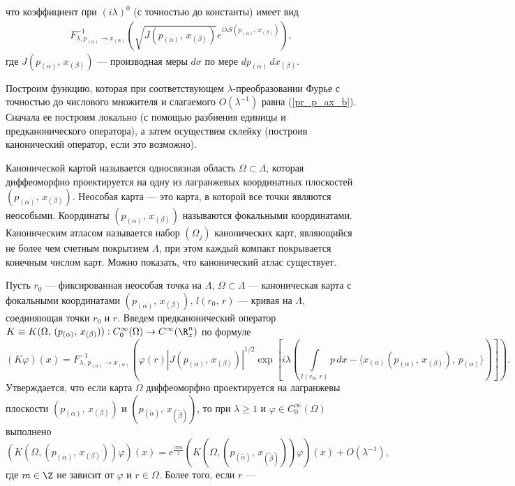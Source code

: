 \documentclass[a4paper
]{article}
\begin{document}
что коэффициент при $(i\lambda)^0$ (с точностью до константы) имеет вид
\begin{align}
\label{pr_p_ax_b}
F^{-1}_{\lambda, p_{(\alpha)}\rightarrow x_{(\alpha)}}\left(\sqrt{J(p_{(\alpha)}, \,
x_{(\beta)})}e^{i\lambda S(p_{(\alpha)}, \, x_{(\beta)})}\right),
\end{align}
где $J(p_{(\alpha)}, \, x_{(\beta)})$ --- производная меры $d\sigma$ по мере $dp_{(\alpha)}
\, dx_{(\beta)}$. \par
Построим функцию, которая при соответствующем $\lambda$-преобразовании Фурье
с точностью до числового множителя и слагаемого $O(\lambda^{-1})$ равна (\ref{pr_p_ax_b}).
Сначала ее построим локально (с помощью разбиения единицы и предканонического оператора),
а затем осуществим склейку (построив канонический оператор, если это возможно). \par
Канонической картой называется односвязная область $\Omega\subset \Lambda$,
которая диффеоморфно проектируется на одну из лагранжевых координатных плоскостей
$(p_{(\alpha)}, \, x_{(\beta)})$.  Неособая карта --- это карта, в которой все точки
являются неособыми. Координаты $(p_{(\alpha)}, \, x_{(\beta)})$ называются
фокальными координатами. Каноническим атласом называется набор $(\Omega_j)$
канонических карт, являющийся не более чем счетным покрытием $\Lambda$, при этом
каждый компакт покрывается конечным числом карт. Можно показать, что канонический
атлас существует. \par
Пусть $r_0$ --- фиксированная неособая точка на $\Lambda$, $\Omega \subset \Lambda$ ---
каноническая карта с фокальными координатами $(p_{(\alpha)}, \, x_{(\beta)})$,
$l(r_0, \, r)$ --- кривая на $\Lambda$, соединяющая точки $r_0$ и $r$. Введем
предканонический оператор $K\equiv K(\Omega, \, (p_{(\alpha)},\, x_{(\beta)})):
C_0^\infty(\Omega)\rightarrow C^\infty(\R^n_x)$ по формуле
$$(K\varphi)(x)=F^{-1}_{\lambda,\, p_{(\alpha)}\rightarrow x_{(\alpha)}}\left(
\varphi(r)|J(p_{(\alpha)}, \, x_{(\beta)})|^{1/2}\exp\left[i\lambda\left( \int \limits
_{l(r_0, \, r)} p\, dx-\langle x_{(\alpha)}(p_{(\alpha)}, \, x_{(\beta)}),
\,p_{(\alpha)}\rangle \right)\right]\right).$$ Утверждается, что если карта $\Omega$
диффеоморфно проектируется
на лагранжевы плоскости $(p_{(\alpha)}, \, x_{(\beta)})$ и $(p_{(\tilde\alpha)}, \,
x_{(\tilde\beta)})$, то при $\lambda\ge 1$ и $\varphi\in C_0^\infty(\Omega)$
выполнено $$(K(\Omega, (p_{(\alpha)}, \, x_{(\beta)}))\varphi)(x)=e^{\frac{i\pi m}{2}}
(K(\Omega, (p_{(\tilde\alpha)}, \, x_{(\tilde\beta)}))\varphi)(x)+O(\lambda^{-1}),$$
где $m\in \Z$ не зависит от $\varphi$ и $r\in \Omega$. Более того, если $r$ ---
\end{document}

